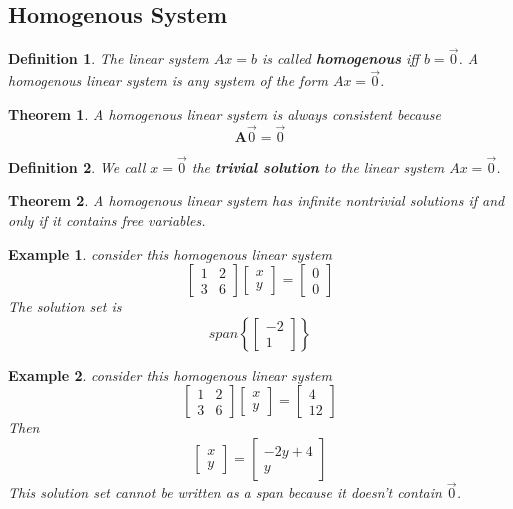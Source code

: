 \documentclass[11pt]{article}
\newtheorem{thm}{Theorem}
\newtheorem{defn}{Definition}
\newtheorem{ex}{Example}
\begin{document}
\subsection{Homogenous System}
\begin{defn}
  The linear system $Ax=b$ is called \textbf{homogenous} iff $b=\vec{0}$. A homogenous linear system is any system of the form $Ax = \vec{0}$.
\end{defn}
\begin{thm}
  A homogenous linear system is always consistent because \[\mathbf{A}\vec{0} = \vec{0}\]
\end{thm}
\begin{defn}
  We call $x = \vec{0}$ the \textbf{trivial solution} to the linear system $Ax = \vec{0}$.
\end{defn}
\begin{thm}
  A homogenous linear system has infinite nontrivial solutions if and only if it contains free variables.
\end{thm}
\begin{ex}
  consider this homogenous linear system
  \[\begin{bmatrix} 1 & 2 \\ 3  & 6 \end{bmatrix} \begin{bmatrix} x \\ y \end{bmatrix} = \begin{bmatrix} 0 \\ 0 \end{bmatrix}\]
  The solution set is
  \[span\left\{\begin{bmatrix} -2 \\ 1 \end{bmatrix}\right\}\]
\end{ex}

\begin{ex}
  consider this homogenous linear system
  \[\begin{bmatrix} 1 & 2 \\ 3  & 6 \end{bmatrix} \begin{bmatrix} x \\ y \end{bmatrix} = \begin{bmatrix} 4 \\ 12 \end{bmatrix}\]
  Then
  \[\begin{bmatrix} x \\ y \end{bmatrix} = \begin{bmatrix} -2y + 4 \\ y \end{bmatrix}\]
  This solution set cannot be written as a span because it doesn't contain $\vec{0}$.
\end{ex}
\end{document}
